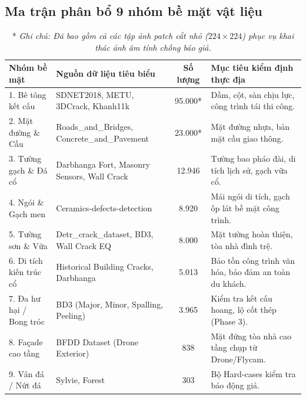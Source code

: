 \documentclass[12pt,a4paper]{article}
\begin{document}
\subsection{Ma trận phân bổ 9 nhóm bề mặt vật liệu}
\begin{table}[H]
\centering
\small
\begin{tabular}{lp{4.2cm}cp{6.5cm}}
\toprule
\textbf{Nhóm bề mặt} & \textbf{Nguồn dữ liệu tiêu biểu} & \textbf{Số lượng} & \textbf{Mục tiêu kiểm định thực địa} \\
\midrule
1. Bê tông kết cấu & SDNET2018, METU, 3DCrack, Khanh11k & 95.000* & Dầm, cột, sàn chịu lực, công trình tái thi công. \\
2. Mặt đường \& Cầu & Roads\_and\_Bridges, Concrete\_and\_Pavement & 23.000* & Mặt đường nhựa, bản mặt cầu giao thông. \\
3. Tường gạch \& Đá cổ & Darbhanga Fort, Masonry Sensors, Wall Crack & 12.946 & Tường bao pháo đài, di tích lịch sử, gạch vữa cổ. \\
4. Ngói \& Gạch men & Ceramics-defects-detection & 8.920 & Mái ngói di tích, gạch ốp lát bề mặt công trình. \\
5. Tường sơn \& Vữa & Detr\_crack\_dataset, BD3, Wall Crack EQ & 8.000 & Mặt tường hoàn thiện, tòa nhà đình trệ. \\
6. Di tích kiến trúc cổ & Historical Building Cracks, Darbhanga & 5.013 & Bảo tồn công trình văn hóa, bảo đảm an toàn du khách. \\
7. Đa hư hại / Bong tróc & BD3 (Major, Minor, Spalling, Peeling) & 3.965 & Kiểm tra kết cấu hoang, lộ cốt thép (Phase 3). \\
8. Façade cao tầng & BFDD Dataset (Drone Exterior) & 838 & Mặt đứng tòa nhà cao tầng chụp từ Drone/Flycam. \\
9. Vân đá / Nứt đá & Sylvie, Forest & 303 & Bộ Hard-cases kiểm tra báo động giả. \\
\bottomrule
\end{tabular}
\caption*{* \footnotesize \textit{Ghi chú: Đã bao gồm cả các tập ảnh patch cắt nhỏ ($224\times224$) phục vụ khai thác ảnh âm tính chống báo giả.}}
\end{table}
\end{document}
